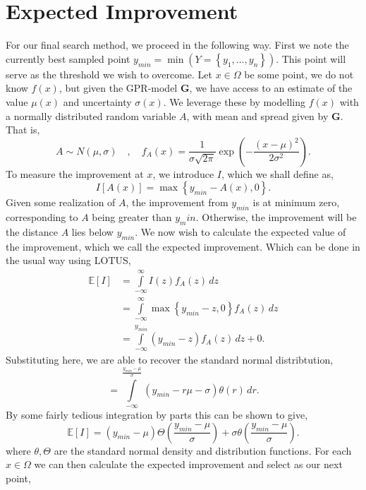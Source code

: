 \documentclass[working, oneside]{../../../Preambles/marginclass}
\begin{document}
\section{Expected Improvement}
For our final search method, we proceed in the following way. First we note the currently best sampled point $y_{min} = \min \left( Y = \left\{ y_1, \ldots , y_n \right\}  \right) $. This point will serve as the threshold we wish to overcome.
Let $x \in \Omega$ be some point, we do not know $f\left( x \right) $, but given the GPR-model $\bm{G}$, we have access to an estimate of the value $\mu \left( x \right) $ and uncertainty $\sigma\left( x \right) $. We leverage these by modelling $f\left( x \right) $ with a normally distributed random variable $A$, with mean and spread given by $\bm{G}$. That is,
 \[
A \sim N\left( \mu, \sigma \right) \quad, \quad f_A\left( x \right) = \frac{1}{\sigma \sqrt{2\pi} }\exp\left( - \frac{\left( x - \mu  \right) ^2}{2\sigma^2} \right) 
.\]
To measure the improvement at $x$, we introduce $I$, which we shall define as,
\[
    I\left[ A\left( x \right) \right] = \max\left\{ y_{min} - A\left( x \right) , 0 \right\}
.\]
Given some realization of $A$, the improvement from $y_{min}$ is at minimum zero, corresponding to $A$ being greater than $y_min$. Otherwise, the improvement will be the distance $A$ lies below $y_{min}$. We now wish to calculate the expected value of the improvement, which we call the expected improvement. Which can be done in the usual way using LOTUS,
\begin{align*}
\mathbb{E}\left[ I \right]  &= \int\limits_{-\infty}^{\infty} I\left( z \right) f_A\left( z \right) \, dz \\
&= \int\limits_{-\infty}^{\infty}  \max\left\{ y_{min} - z, 0 \right\} f_A\left( z \right) \, dz\\
&= \int\limits_{-\infty}^{y_{min}} \left( y_{min}-z \right) f_A\left( z \right)\, dz + 0
.\end{align*}
Substituting here, we are able to recover the standard normal distribtution,
\[
 =   \int\limits_{-\infty}^{\frac{y_{min} - \mu }{\sigma}}\left( y_{min} - r\mu - \sigma \right) \theta \left( r \right) \, dr
.\] 
By some fairly tedious integration by parts this can be shown to give,
\[
\mathbb{E}\left[ I \right] = \left( y_{min} - \mu  \right) \Theta\left(\frac{y_{min} - \mu }{\sigma} \right) + \sigma \theta \left( \frac{y_{min} - \mu }{\sigma} \right) 
.\] 
where $\theta, \Theta$ are the standard normal density and distribution functions. For each $x \in  \Omega$ we can then calculate the expected improvement and select as our next point,
\end{document}
